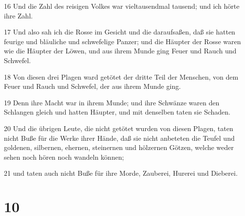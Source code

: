 \par 16 Und die Zahl des reisigen Volkes war vieltausendmal tausend; und ich hörte ihre Zahl.
\par 17 Und also sah ich die Rosse im Gesicht und die daraufsaßen, daß sie hatten feurige und bläuliche und schwefelige Panzer; und die Häupter der Rosse waren wie die Häupter der Löwen, und aus ihrem Munde ging Feuer und Rauch und Schwefel.
\par 18 Von diesen drei Plagen ward getötet der dritte Teil der Menschen, von dem Feuer und Rauch und Schwefel, der aus ihrem Munde ging.
\par 19 Denn ihre Macht war in ihrem Munde; und ihre Schwänze waren den Schlangen gleich und hatten Häupter, und mit denselben taten sie Schaden.
\par 20 Und die übrigen Leute, die nicht getötet wurden von diesen Plagen, taten nicht Buße für die Werke ihrer Hände, daß sie nicht anbeteten die Teufel und goldenen, silbernen, ehernen, steinernen und hölzernen Götzen, welche weder sehen noch hören noch wandeln können;
\par 21 und taten auch nicht Buße für ihre Morde, Zauberei, Hurerei und Dieberei.

\chapter{10}

